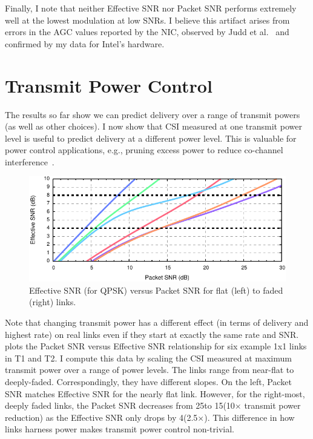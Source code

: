 Finally, I note that neither Effective SNR nor Packet SNR performs extremely well at the lowest modulation at low SNRs. I believe this artifact arises from errors in the AGC values reported by the NIC, observed by Judd et al.~\cite{Judd_CHARM} and confirmed by my data for Intel's hardware.

\section{Transmit Power Control}
\label{sec:tx_power_trim}
The results so far show we can predict delivery over a range of transmit powers (as well as other choices). I now show that CSI measured at one transmit power level is useful to predict delivery at a different power level. This is valuable for power control applications, e.g., pruning excess power to reduce co-channel interference~\cite{Monks_PowerMAC,Ramachandran_Symphony,Son_PowerStudy}. 

\begin{figure}[t]
  \centering
  \includegraphics[width=\textwidth]{figures/eff_vs_snr_qpsk.pdf}
  \caption[Effective SNR vs Packet SNR for four faded links]{Effective SNR (for QPSK) versus Packet SNR for flat (left) to faded (right) links.}
  \label{fig:eff_vs_rssi}
\end{figure}

Note that changing transmit power has a different effect (in terms of delivery and highest rate) on real links even if they start at exactly the same rate and SNR.  plots the Packet SNR versus Effective SNR relationship for six example 1x1 links in T1 and T2.
I compute this data by scaling the CSI measured at maximum transmit power over a range of power levels.
The links range from near-flat to deeply-faded. Correspondingly, they have different slopes. On the left, Packet SNR matches Effective SNR for the nearly flat link. 
However, for the right-most, deeply faded links, the Packet SNR decreases from 25\dB to 15\dB (10$\times$ transmit power reduction) as the Effective SNR only drops by 4\dB (2.5$\times$). This difference in how links harness power makes transmit power control non-trivial.


